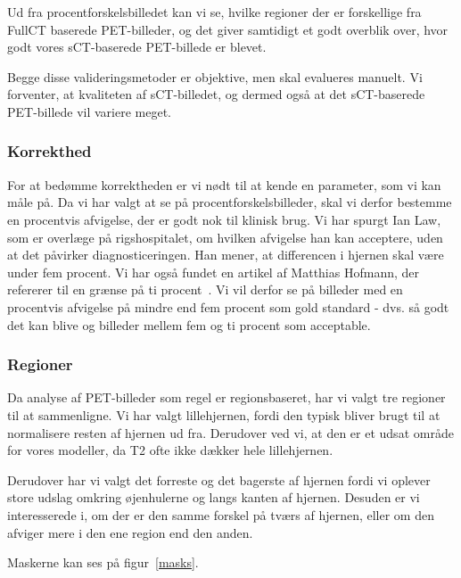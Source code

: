 Ud fra procentforskelsbilledet kan vi se, hvilke regioner der er forskellige fra FullCT baserede PET-billeder, og det giver samtidigt et godt overblik over, hvor godt vores sCT-baserede PET-billede er blevet.

Begge disse valideringsmetoder er objektive, men skal evalueres manuelt. Vi forventer, at kvaliteten af sCT-billedet, og dermed også at det sCT-baserede PET-billede vil variere meget.

\subsubsection{Korrekthed}

For at bedømme korrektheden er vi nødt til at kende en parameter, som vi kan måle på. Da vi har valgt at se på procentforskelsbilleder, skal vi
derfor bestemme en procentvis afvigelse, der er godt nok til klinisk brug.
Vi har spurgt Ian Law, som er overlæge på rigshospitalet, om hvilken afvigelse
han kan acceptere, uden at det påvirker diagnosticeringen. Han mener, at
differencen i hjernen skal være under fem procent. Vi har også fundet en
artikel af Matthias Hofmann, der refererer til en grænse på ti procent~\cite{accepteretAfvigelse}. Vi
vil derfor se på billeder med en procentvis afvigelse på mindre end fem
procent som gold standard - dvs. så godt det kan blive og billeder
mellem fem og ti procent som acceptable.

\subsubsection{Regioner}

Da analyse af PET-billeder som regel er regionsbaseret, har vi valgt tre
regioner til at sammenligne. Vi har valgt lillehjernen, fordi den
typisk bliver brugt til at normalisere resten af hjernen ud fra. Derudover ved vi, at den er
et udsat område for vores modeller, da T2 ofte ikke dækker hele
lillehjernen. 

Derudover har vi valgt det forreste og det bagerste af hjernen fordi vi oplever store udslag omkring øjenhulerne og langs kanten af hjernen. Desuden er vi interesserede i, om der er den samme forskel på tværs af
hjernen, eller om den afviger mere i den ene region end den anden.

Maskerne kan ses på figur~\ref{masks}.

